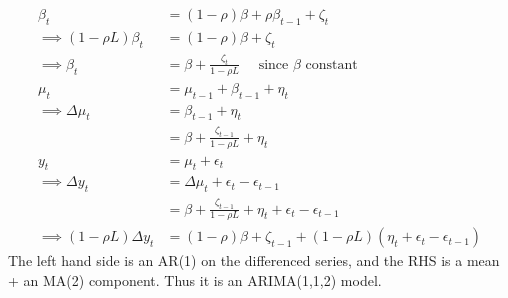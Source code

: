 \documentclass[DIV=14,titlepage=false]{scrreprt}
\begin{document}
\begin{solution}
\begin{align*}
    \beta_t &= (1-\rho)\beta + \rho \beta_{t-1} + \zeta_t\\
    \implies (1-\rho L) \beta_t &= (1-\rho)\beta + \zeta_t\\
    \implies \beta_t &= \beta + \frac{\zeta_t}{1-\rho L} \quad \text{ since $\beta$ constant}\\
    \mu_t &= \mu_{t-1} + \beta_{t-1} + \eta_t\\
    \implies \Delta \mu_t &= \beta_{t-1} + \eta_t\\
    &= \beta + \frac{\zeta_{t-1}}{1-\rho L} + \eta_t\\
    y_t &= \mu_t + \epsilon_t\\
    \implies \Delta y_t &= \Delta \mu_t + \epsilon_t - \epsilon_{t-1}\\
    &= \beta + \frac{\zeta_{t-1}}{1-\rho L} + \eta_t + \epsilon_t - \epsilon_{t-1}\\
    \implies (1- \rho L) \Delta y_t &= (1-\rho)\beta + \zeta_{t-1} + (1-\rho L) (\eta_t + \epsilon_t - \epsilon_{t-1})
\end{align*}
The left hand side is an AR(1) on the differenced series, and the RHS is a mean + an MA(2) component. Thus it is an ARIMA(1,1,2) model.
\end{solution}
\end{document}
